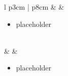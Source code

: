 \documentclass[8pt,usenames,dvipsnames,twoside]{article}
\begin{document}
\begin{center}
\begin{longtable}{l p{3cm} | p{8cm}}
			\midrule
			\textbullet &  &
			\begin{minipage}[t]{\linewidth}
				\vspace{-7pt}
				\begin{itemize}
					\item placeholder
				\end{itemize}
			\end{minipage} \\
			\midrule
			\textbullet &  &
			\begin{minipage}[t]{\linewidth}
				\vspace{-7pt}
				\begin{itemize}
					\item placeholder
				\end{itemize}
			\end{minipage} \\
			\bottomrule
		\end{longtable}
	\end{center}
\end{document}
